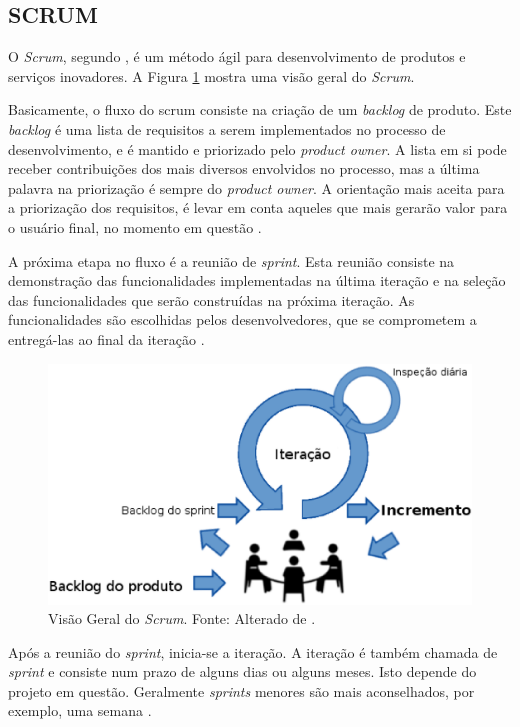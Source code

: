 \subsection{SCRUM}
\label{scrum_sec}

O \emph{Scrum}, segundo , é um método ágil para desenvolvimento de produtos e serviços inovadores. 
A Figura \ref{scrum_geral} mostra uma visão geral do \emph{Scrum}.


Basicamente, o fluxo do scrum consiste na criação de um \emph{backlog} de produto. 
Este \emph{backlog} é uma lista de requisitos a serem implementados no processo de desenvolvimento, e é mantido e priorizado pelo \emph{product owner}. 
A lista em si pode receber contribuições dos mais diversos envolvidos no processo, mas a última palavra na priorização é sempre do \emph{product owner}.
A orientação mais aceita para a priorização dos requisitos, é levar em conta aqueles que mais gerarão valor para o usuário final, no momento em questão \cite{Schwaber2001}.

A próxima etapa no fluxo é a reunião de \emph{sprint}. 
Esta reunião consiste na demonstração das funcionalidades implementadas na última iteração e na seleção das funcionalidades que serão construídas na próxima iteração.
As funcionalidades são escolhidas pelos desenvolvedores, que se comprometem a entregá-las ao final da iteração \cite{Schwaber2004}.


\begin{figure}[H]
	\centering
	\includegraphics[width=15cm]{figuras/scrum_geral.eps}
	\caption{Visão Geral do \emph{Scrum}. Fonte: Alterado de .}
	\label{scrum_geral}
\end{figure}



Após a reunião do \emph{sprint}, inicia-se a iteração. A iteração é também chamada de \emph{sprint} e consiste num prazo de alguns dias ou alguns meses. 
Isto depende do projeto em questão. Geralmente \emph{sprints} menores são mais aconselhados, por exemplo, uma semana  \cite{Schwaber2004}.

